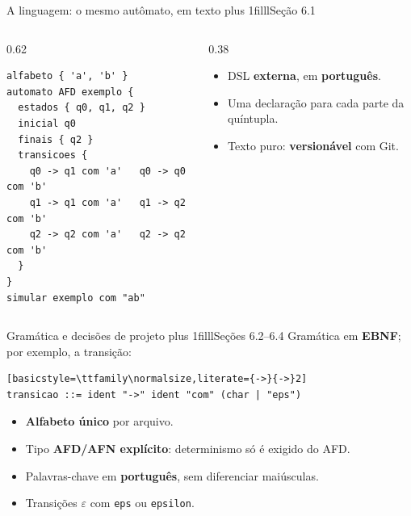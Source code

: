 \documentclass[aspectratio=169,12pt]{beamer}
\newcommand{\notexto}[1]{\hskip 0pt plus 1filll{\normalfont\small\color{white!85!acento}#1}}
\begin{document}
\begin{frame}[fragile]{A linguagem: o mesmo autômato, em texto\notexto{Seção 6.1}}
  \begin{columns}[T]
    \begin{column}{0.62\textwidth}
\begin{lstlisting}[language=asl,basicstyle=\ttfamily\normalsize,aboveskip=0pt]
alfabeto { 'a', 'b' }
automato AFD exemplo {
  estados { q0, q1, q2 }
  inicial q0
  finais { q2 }
  transicoes {
    q0 -> q1 com 'a'   q0 -> q0 com 'b'
    q1 -> q1 com 'a'   q1 -> q2 com 'b'
    q2 -> q2 com 'a'   q2 -> q2 com 'b'
  }
}
simular exemplo com "ab"
\end{lstlisting}
    \end{column}
    \begin{column}{0.38\textwidth}
      \begin{itemize}
        \item DSL \textbf{externa}, em \textbf{português}.
        \item Uma declaração para cada parte da quíntupla.
        \item Texto puro: \textbf{versionável} com Git.
      \end{itemize}
    \end{column}
  \end{columns}
\end{frame}

\begin{frame}[fragile]{Gramática e decisões de projeto\notexto{Seções 6.2--6.4}}
  Gramática em \textbf{EBNF}; por exemplo, a transição:
\begin{lstlisting}[basicstyle=\ttfamily\normalsize,literate={->}{->}2]
transicao ::= ident "->" ident "com" (char | "eps")
\end{lstlisting}
  \vspace{4pt}
  \begin{itemize}
    \item \textbf{Alfabeto único} por arquivo.
    \item Tipo \textbf{AFD/AFN explícito}: determinismo só é exigido do AFD.
    \item Palavras-chave em \textbf{português}, sem diferenciar maiúsculas.
    \item Transições $\varepsilon$ com \texttt{eps} ou \texttt{epsilon}.
  \end{itemize}
\end{frame}

\end{document}
